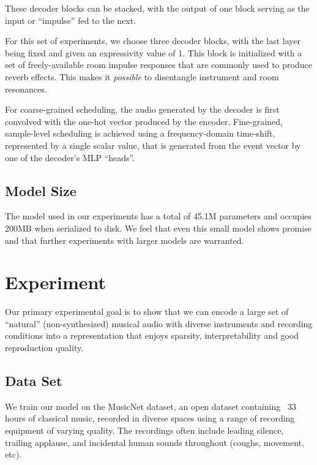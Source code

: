 \documentclass[9pt,conference]{IEEEtran}
\begin{document}
These decoder blocks can be stacked, with the output of one block serving as the 
input or ``impulse'' fed to the next.

For this set of experiments, we choose three decoder blocks, with the last 
layer being fixed and given an expressivity value of 1.  This block is initialized 
with a set of freely-available room impulse responses\cite{voxengoir} that are commonly 
used to produce reverb effects.  This makes it \emph{possible} to disentangle instrument 
and room resonances.

For coarse-grained scheduling, the audio generated by the decoder is first 
convolved with the one-hot vector produced by the encoder.  Fine-grained, 
sample-level scheduling is achieved using a frequency-domain time-shift, 
represented by a single scalar value, that is generated from the event vector
by one of the decoder's MLP ``heads''.

\subsection{Model Size}
\label{ssec:model_size}

The model used in our experiments has a total of 45.1M parameters and occupies 
200MB when serialized to disk.  We feel that even this small model shows promise 
and that further experiments with larger models are warranted.

\section{Experiment}
\label{sec:experiments}

Our primary experimental goal is to show that we can encode a large set of 
``natural'' (non-synthesized) musical audio with diverse instruments and 
recording conditions into a representation that enjoys sparsity, interpretability 
and good reproduction quality.

\subsection{Data Set}
\label{ssec:data_set}

We train our model on the MusicNet dataset\cite{thickstun2017learning}, an open dataset containing ~33 hours 
of classical music, recorded in diverse spaces using a range of 
recording equipment of varying quality.  The recordings often include leading 
silence, trailing applause, and incidental human sounds throughout 
(coughs, movement, etc).
\end{document}
